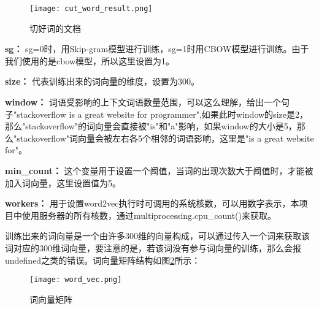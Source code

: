 \begin{figure}[H]
  \begin{center}
    \texttt{[image: cut\_word\_result.png]}
    \caption{切好词的文档}
    \label{cut_word_file}
  \end{center}
\end{figure} 

\textbf{sg：} sg=0时，用Skip-gram模型进行训练，sg=1时用CBOW模型进行训练。由于我们使用的是cbow模型，所以这里设置为1。

\textbf{size：} 代表训练出来的词向量的维度，设置为300。

\textbf{window：} 词语受影响的上下文词语数量范围，可以这么理解，给出一个句子"stackoverflow is a great website for programmer",如果此时window的size是2，那么"stackoverflow"的词向量会直接被"is"和"a"影响，如果window的大小是5，那么"stackoverflow"词向量会被左右各5个相邻的词语影响，这里是"is a great website for"。

\textbf{min\_count：} 这个变量用于设置一个阈值，当词的出现次数大于阈值时，才能被加入词向量，这里设置值为5。

\textbf{workers：} 用于设置word2vec执行时可调用的系统核数，可以用数字表示，本项目中使用服务器的所有核数，通过multiprocessing.cpu\_count()来获取。

训练出来的词向量是一个由许多300维的向量构成，可以通过传入一个词来获取该词对应的300维词向量，要注意的是，若该词没有参与词向量的训练，那么会报undefined之类的错误。词向量矩阵结构如图\ref{word_vec_array}所示：

\begin{figure}[H]
  \begin{center}
    \texttt{[image: word\_vec.png]}
    \caption{词向量矩阵}
    \label{word_vec_array}
  \end{center}
\end{figure} 
